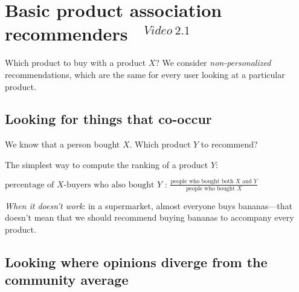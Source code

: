 \documentclass[11pt]{article}
\begin{document}



\section{Basic product association recommenders ~$^{Video~2.1}$}

Which product to buy with a product $X$? 
We consider \emph{non-personalized} recommendations,
which are the same for every user looking at a particular product.

\subsection{Looking for things that co-occur}

We know that a person bought $X$. Which product $Y$ to recommend?

The simplest way to compute the ranking of a product $Y$:

$\text{percentage of $X$-buyers who also bought $Y$ : }
\frac{\text{people who bought both $X$ and $Y$}}
{\text{people who bought $X$}}$

\emph{When it doesn't work}: in a supermarket, almost everyone buys bananas---that doesn't mean that we should recommend buying bananas to accompany every product.

\subsection{Looking where opinions diverge from the community average}
\end{document}

